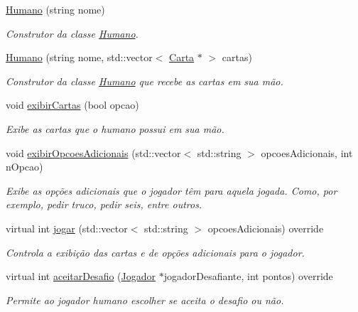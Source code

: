 \begin{DoxyCompactItemize}
\item 
\mbox{\hyperlink{class_humano_a0a77741425558703321b7a1f24bf5f8f}{Humano}} (string nome)
\begin{DoxyCompactList}\small\item\em Construtor da classe \mbox{\hyperlink{class_humano}{Humano}}. \end{DoxyCompactList}\item 
\mbox{\hyperlink{class_humano_a7af6096fca83f9c64cf893156f749e22}{Humano}} (string nome, std\+::vector$<$ \mbox{\hyperlink{class_carta}{Carta}} $\ast$ $>$ cartas)
\begin{DoxyCompactList}\small\item\em Construtor da classe \mbox{\hyperlink{class_humano}{Humano}} que recebe as cartas em sua mão. \end{DoxyCompactList}\item 
void \mbox{\hyperlink{class_humano_a44adc47b7acc857f0614c82e53a7759f}{exibir\+Cartas}} (bool opcao)
\begin{DoxyCompactList}\small\item\em Exibe as cartas que o humano possui em sua mão. \end{DoxyCompactList}\item 
void \mbox{\hyperlink{class_humano_a9be2c952d918117be73a00f2c538834c}{exibir\+Opcoes\+Adicionais}} (std\+::vector$<$ std\+::string $>$ opcoes\+Adicionais, int n\+Opcao)
\begin{DoxyCompactList}\small\item\em Exibe as opções adicionais que o jogador têm para aquela jogada. Como, por exemplo, pedir truco, pedir seis, entre outros. \end{DoxyCompactList}\item 
virtual int \mbox{\hyperlink{class_humano_aad706f019b99747f9c49d915f678998d}{jogar}} (std\+::vector$<$ std\+::string $>$ opcoes\+Adicionais) override
\begin{DoxyCompactList}\small\item\em Controla a exibição das cartas e de opções adicionais para o jogador. \end{DoxyCompactList}\item 
virtual int \mbox{\hyperlink{class_humano_aa1cd4b8c801b73190ad1472f6fc860b1}{aceitar\+Desafio}} (\mbox{\hyperlink{class_jogador}{Jogador}} $\ast$jogador\+Desafiante, int pontos) override
\begin{DoxyCompactList}\small\item\em Permite ao jogador humano escolher se aceita o desafio ou não. \end{DoxyCompactList}\end{DoxyCompactItemize}

